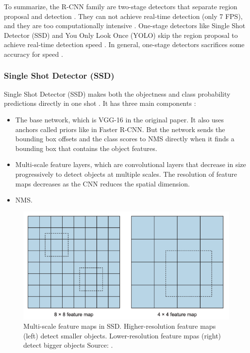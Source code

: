 \documentclass[a4paper, 11pt, oneside]{article}
\begin{document}
  To summarize, the R-CNN family are two-stage detectors that separate region proposal and detection \cite{elgendy2020deep}.
  They can not achieve real-time detection (only 7 FPS), and they are too computationally intensive
  \cite{elgendy2020deep, liu2016ssd, redmon2016you}. One-stage detectors like Single Shot Detector (SSD) and You Only
  Look Once (YOLO) skip the region proposal to achieve real-time detection speed \cite{elgendy2020deep}. In general,
  one-stage detectors sacrifices some accuracy for speed \cite{elgendy2020deep, lin2017focal}.

  \subsubsection{Single Shot Detector (SSD)}

  Single Shot Detector (SSD) makes both the objectness and class probability predictions directly in one shot
  \cite{elgendy2020deep, liu2016ssd}. It has three main components \cite{elgendy2020deep, liu2016ssd}:

  \begin{itemize}
    \item The base network, which is VGG-16 in the original paper. It also uses anchors called priors like in Faster R-CNN.
    But the network sends the bounding box offsets and the class scores to NMS directly when it finds a bounding box that
    contains the object features.
    \item Multi-scale feature layers, which are convolutional layers that decrease in size progressively to detect objects
    at multiple scales. The resolution of feature maps decreases as the CNN reduces the spatial dimension.
    \item NMS.
  \end{itemize}

  \begin{figure}[ht]
    \begin{center}
      \includegraphics[width=.8\textwidth]{ssd_feature_maps.png}
    \end{center}
    \caption{Multi-scale feature maps in SSD. Higher-resolution feature maps (left) detect smaller objects.
    Lower-resolution feature mpas (right) detect bigger objects Source: \cite{elgendy2020deep}.}
  \end{figure}
\end{document}
